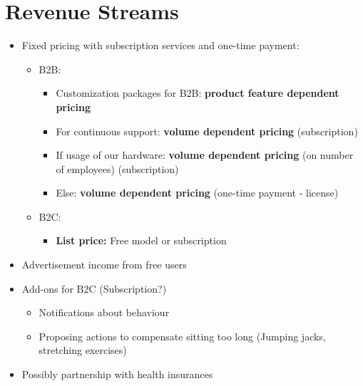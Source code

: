 \section{Revenue Streams}
\begin{itemize}
    \item Fixed pricing with subscription services and one-time payment:
        \begin{itemize}
            \item B2B:
                \begin{itemize}
                    \item Customization packages for B2B: \textbf{product feature dependent pricing}
                    \item For continuous support:  \textbf{volume dependent pricing} (subscription)
                    \item If usage of our hardware: \textbf{volume dependent pricing} (on number of employees) (subscription)
                    \item Else: \textbf{volume dependent pricing} (one-time payment - license)
                \end{itemize}
            \item B2C:
                \begin{itemize}
                    \item \textbf{List price:} Free model or subscription
                \end{itemize}
        \end{itemize}
    \item Advertisement income from free users
    \item Add-ons for B2C (Subscription?)
    \begin{itemize}
        \item Notifications about behaviour
        \item Proposing actions to compensate sitting too long (Jumping jacks, stretching exercises)
    \end{itemize}
    \item Possibly partnership with health insurances
\end{itemize}